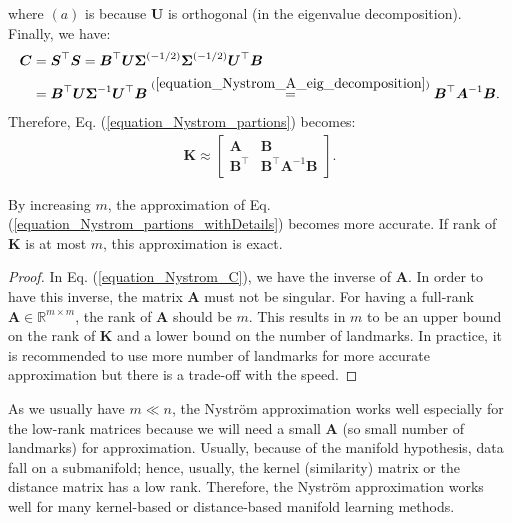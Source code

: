 \documentclass[lang=cn,10pt]{gorgeousnbook}
\numberwithin{equation}{section}%
\numberwithin{figure}{section}%
\begin{document}
where $(a)$ is because $\boldsymbol{U}$ is orthogonal (in the eigenvalue decomposition). 
Finally, we have:
\begin{align}
\boldsymbol{C} &= \boldsymbol{S}^\top \boldsymbol{S} = \boldsymbol{B}^\top \boldsymbol{U} \boldsymbol{\Sigma}^{(-1/2)} \boldsymbol{\Sigma}^{(-1/2)} \boldsymbol{U}^\top \boldsymbol{B} \nonumber \\
&= \boldsymbol{B}^\top \boldsymbol{U} \boldsymbol{\Sigma}^{-1} \boldsymbol{U}^\top \boldsymbol{B} \overset{(\ref{equation_Nystrom_A_eig_decomposition})}{=} \boldsymbol{B}^\top \boldsymbol{A}^{-1} \boldsymbol{B}. \label{equation_Nystrom_C}
\end{align}
Therefore, Eq. (\ref{equation_Nystrom_partions}) becomes:
\begin{align}\label{equation_Nystrom_partions_withDetails}
\boldsymbol{K} \approx 
\left[
\begin{array}{c|c}
\boldsymbol{A} & \boldsymbol{B} \\
\hline
\boldsymbol{B}^\top & \boldsymbol{B}^\top \boldsymbol{A}^{-1} \boldsymbol{B}
\end{array}
\right].
\end{align}

\begin{lemma}
By increasing $m$, the approximation of Eq. (\ref{equation_Nystrom_partions_withDetails}) becomes more accurate. 
If rank of $\boldsymbol{K}$ is at most $m$, this approximation is exact. 
\end{lemma}
\begin{proof}
In Eq. (\ref{equation_Nystrom_C}), we have the inverse of $\boldsymbol{A}$. In order to have this inverse, the matrix $\boldsymbol{A}$ must not be singular. For having a full-rank $\boldsymbol{A} \in \mathbb{R}^{m \times m}$, the rank of $\boldsymbol{A}$ should be $m$. This results in $m$ to be an upper bound on the rank of $\boldsymbol{K}$ and a lower bound on the number of landmarks. In practice, it is recommended to use more number of landmarks for more accurate approximation but there is a trade-off with the speed. 
\end{proof}

\begin{corollary}\label{corollary_Nystron_rank_discussion}
As we usually have $m \ll n$, the Nystr{\"o}m approximation works well especially for the low-rank matrices \cite{kishore2017literature} because we will need a small $\boldsymbol{A}$ (so small number of landmarks) for approximation. Usually, because of the manifold hypothesis, data fall on a submanifold; hence, usually, the kernel (similarity) matrix  or the distance matrix has a low rank. Therefore, the Nystr{\"o}m approximation works well for many kernel-based or distance-based manifold learning methods. 
\end{corollary}
\end{document}
